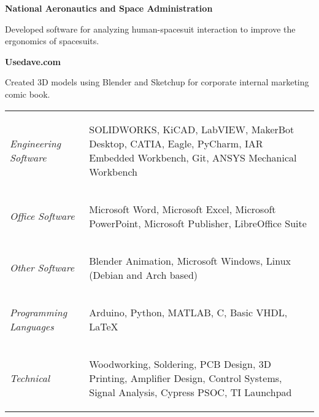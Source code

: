 \documentclass[letterpaper,ddMMMyyyy,nonstopmode]{simpleresumecv}
\newcommand{\descriptionWidth}{33em}
\newcommand{\tableWidth}{23.5em}
\newenvironment{Description}
{%
	\SmallGap
	\par
	\begin{Detail}
		\Item
		\begin{minipage}{\descriptionWidth}
}
{\par
\end{minipage}
\end{Detail}
}
\begin{document}
\begin{Body}
		\Entry\textbf{National Aeronautics and Space Administration}\hfill{}\\

		\begin{Description}
			Developed software for analyzing human-spacesuit interaction to improve the ergonomics of spacesuits.
		\end{Description}
		\Gap

		\Entry\textbf{Usedave.com}\hfill{}

		\begin{Description}
				Created 3D models using Blender and Sketchup for corporate internal marketing comic book.

		\end{Description}



		\Gap
		\def\arraystretch{0}%
		\hspace*{-0.8em}
		\begin{tabular}[t]{p{11em} p{\tableWidth}}
			\textit{Engineering Software} &
			\begin{Detail}
				SOLIDWORKS, KiCAD, LabVIEW, MakerBot Desktop, CATIA, Eagle, PyCharm, IAR Embedded Workbench, Git, ANSYS Mechanical Workbench
			\end{Detail}\\
			\textit{Office Software} &
			\begin{Detail}
				Microsoft Word, Microsoft Excel, Microsoft PowerPoint, Microsoft Publisher, LibreOffice Suite
			\end{Detail}\\
			\textit{Other Software}&
			\begin{Detail}
				Blender Animation, Microsoft Windows, Linux (Debian and Arch based)
			\end{Detail}\\
			\textit{Programming Languages} &
			\begin{Detail}
				Arduino, Python, MATLAB, C, Basic VHDL, LaTeX
			\end{Detail}\\
			\textit{Technical}&
			\begin{Detail}
				Woodworking, Soldering, PCB Design, 3D Printing, Amplifier Design, Control Systems, Signal Analysis, Cypress PSOC, TI Launchpad
            \end{Detail}
            \vspace{-1em}


\end{tabular}
\end{Body}
\end{document}
